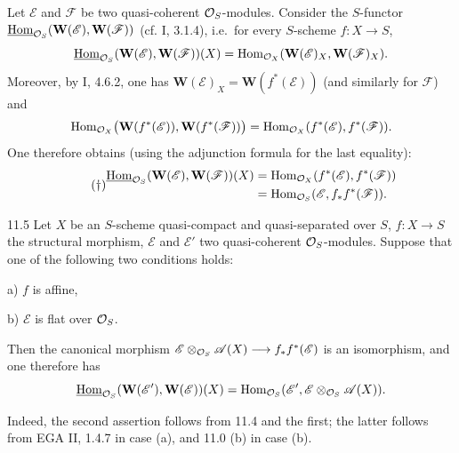 \label{VIB.11.4}
Let $\mathscr E$ and $\mathscr F$ be two quasi-coherent $\mathcal{O}_S$-modules. Consider the $S$-functor $\underline{\operatorname{Hom}}_{\mathcal{O}_S}(\mathbf W(\mathscr E),\mathbf W(\mathscr F))$ (cf. I, 3.1.4), i.e.\ for every $S$-scheme $f:X\to S$,
\[
\underline{\operatorname{Hom}}_{\mathcal{O}_S}(\mathbf W(\mathscr E),\mathbf W(\mathscr F))(X)=\operatorname{Hom}_{\mathcal{O}_X}(\mathbf W(\mathscr E)_X,\mathbf W(\mathscr F)_X).
\]
Moreover, by I, 4.6.2, one has $\mathbf W(\mathscr E)_X=\mathbf W(f^*(\mathscr E))$ (and similarly for $\mathscr F$) and
\[
\operatorname{Hom}_{\mathcal{O}_X}\bigl(\mathbf W(f^*(\mathscr E)),\mathbf W(f^*(\mathscr F))\bigr)=\operatorname{Hom}_{\mathcal{O}_X}(f^*(\mathscr E),f^*(\mathscr F)).
\]
One therefore obtains (using the adjunction formula for the last equality):
\begin{equation*}\tag{$\dagger$}
\begin{split}
\underline{\operatorname{Hom}}_{\mathcal{O}_S}(\mathbf W(\mathscr E),\mathbf W(\mathscr F))(X)&=\operatorname{Hom}_{\mathcal{O}_X}(f^*(\mathscr E),f^*(\mathscr F))\\
&=\operatorname{Hom}_{\mathcal{O}_S}(\mathscr E,f_*f^*(\mathscr F)).
\end{split}
\end{equation*}

\begin{proposition}{11.5}\label{VIB.11.5}
Let $X$ be an $S$-scheme quasi-compact and quasi-separated over $S$, $f:X\to S$ the structural morphism, $\mathscr E$ and $\mathscr E'$ two quasi-coherent $\mathcal{O}_S$-modules. Suppose that one of the following two conditions holds:

a) $f$ is affine,

b) $\mathscr E$ is flat over $\mathcal{O}_S$.

Then the canonical morphism $\mathscr E\otimes_{\mathcal{O}_S}\mathscr A(X)\longrightarrow f_*f^*(\mathscr E)$ is an isomorphism, and one therefore has
\[
\underline{\operatorname{Hom}}_{\mathcal{O}_S}(\mathbf W(\mathscr E'),\mathbf W(\mathscr E))(X)=\operatorname{Hom}_{\mathcal{O}_S}(\mathscr E',\mathscr E\otimes_{\mathcal{O}_S}\mathscr A(X)).
\]
\end{proposition}
Indeed, the second assertion follows from 11.4 and the first; the latter follows from EGA II, 1.4.7 in case (a), and 11.0 (b) in case (b).
